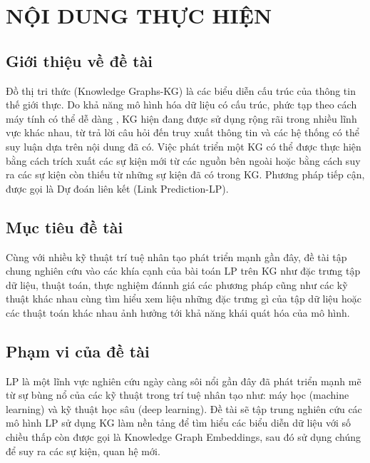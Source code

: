 \documentclass{article}[14pt]
\begin{document}
    \section{NỘI DUNG THỰC HIỆN}
    {

    
    \subsection{Giới thiệu về đề tài}
    
    Đồ thị tri thức (Knowledge Graphs-KG) là các biểu diễn cấu trúc của thông tin thế giới thực. Do khả năng mô hình hóa dữ liệu có cấu trúc, phức tạp theo cách máy tính có thể dễ dàng , KG hiện đang được sử dụng rộng rãi trong nhiều lĩnh vực khác nhau, từ trả lời câu hỏi đến truy xuất thông tin và các hệ thống có thể suy luận dựa trên nội dung đã có.
    Việc phát triển một KG có thể được thực hiện bằng cách trích xuất các sự kiện mới từ các nguồn bên ngoài hoặc bằng cách suy ra các sự kiện còn thiếu từ những sự kiện đã có trong KG. Phương pháp tiếp cận, được gọi là Dự đoán liên kết (Link Prediction-LP).
    
    \subsection{Mục tiêu đề tài}
    Cùng với nhiều kỹ thuật trí tuệ nhân tạo phát triển mạnh gần đây, đề tài tập chung nghiên cứu vào các khía cạnh của bài toán LP trên KG như đặc trưng tập dữ liệu, thuật toán, thực nghiệm đánnh giá các phương pháp cũng như các kỹ thuật khác nhau cùng tìm hiểu xem liệu những đặc trưng gì của tập dữ liệu hoặc các thuật toán khác nhau ảnh hưởng tới khả năng khái quát hóa của mô hình.
    \subsection{Phạm vi của đề tài}
    
    LP là một lĩnh vực nghiên cứu ngày càng sôi nổi gần đây đã phát triển mạnh mẽ từ sự bùng nổ của các kỹ thuật trong trí tuệ nhân tạo như: máy học (machine learning) và kỹ thuật học sâu (deep learning). Đề tài sẽ tập trung nghiên cứu các mô hình LP sử dụng KG làm nền tảng để tìm hiểu các biểu diễn dữ liệu với số chiều thấp còn được gọi là Knowledge Graph Embeddings, sau đó sử dụng chúng để suy ra các sự kiện, quan hệ mới.
    
}
\end{document}
